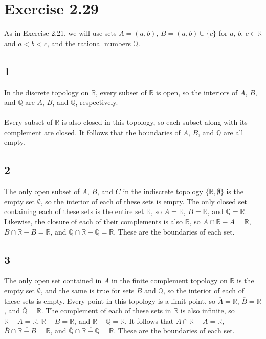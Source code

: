 \documentclass{article}
\begin{document}
\section*{Exercise 2.29}
As in Exercise 2.21, we will use sets $A = (a, b)$, $B = (a, b) \cup \{c\}$ for 
$a$, $b$, $c \in \mathbb{R}$ and $a < b < c$, and the rational numbers $\mathbb{Q}$.

\subsection*{1}
In the discrete topology on $\mathbb{R}$, every subset of $\mathbb{R}$ is open, 
so the interiors of $A$, $B$, and $\mathbb{Q}$ are $A$, $B$, and $\mathbb{Q}$, 
respectively.\\ 
\\ 
Every subset of $\mathbb{R}$ is also closed in this topology, so each subset 
along with its complement are closed.  It follows that the boundaries of $A$, 
$B$, and $\mathbb{Q}$ are all empty.

\subsection*{2}
The only open subset of $A$, $B$, and $C$ in the indiscrete topology $\{\mathbb{R}, \emptyset \}$ is the empty set $\emptyset$, 
so the interior of each of these sets is empty.  The only closed set containing each 
of these sets is the entire set $\mathbb{R}$, so $\overline{A} = \mathbb{R}$, $\overline{B} = \mathbb{R}$, and $\overline{\mathbb{Q}} = \mathbb{R}$.  
Likewise, the closure of each of their complements is also $\mathbb{R}$, so $\overline{A} \cap \overline{\mathbb{R}-A} = \mathbb{R}$, 
$\overline{B} \cap \overline{\mathbb{R}-B} = \mathbb{R}$, and $\overline{\mathbb{Q}} \cap \overline{\mathbb{R}-\mathbb{Q}} = \mathbb{R}$.  These 
are the boundaries of each set.

\subsection*{3} 
The only open set contained in $A$ in the finite complement topology on $\mathbb{R}$ is the 
empty set $\emptyset$, and the same is true for sets $B$ and $\mathbb{Q}$, so the interior 
of each of these sets is empty.  Every point in this topology is a limit point, so 
$\overline{A} = \mathbb{R}$, $\overline{B} = \mathbb{R}$, and $\overline{\mathbb{Q}} = \mathbb{R}$.  The complement of each of these 
sets in $\mathbb{R}$ is also infinite, so $\overline{\mathbb{R}-A} = \mathbb{R}$, $\overline{\mathbb{R}-B} = \mathbb{R}$, 
and $\overline{\mathbb{R}-\mathbb{Q}} = \mathbb{R}$.  It follows that $\overline{A} \cap \overline{\mathbb{R}-A} = \mathbb{R}$, 
$\overline{B} \cap \overline{\mathbb{R}-B} = \mathbb{R}$, and $\overline{\mathbb{Q}} \cap \overline{\mathbb{R}-\mathbb{Q}} = \mathbb{R}$.  
These are the boundaries of each set.
\end{document}
